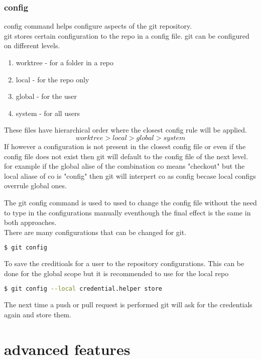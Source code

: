 \documentclass{book}
\begin{document}
\section{config}
config command helps configure aspects of the git repository.\\
git stores certain configuration to the repo in a config file.
git can be configured on different levels.
\begin{enumerate}
\item worktree - for a folder in a repo
\item local    - for the repo only
\item global   - for the user
\item system   - for all users
\end{enumerate}
These files have hierarchical order where the closest config rule will be applied. \\
$$worktree > local >  global > system $$
If however a configuration is not present in the closest config file or even if the config file 
does not exist then git will default to the config file of the next level.
for example 
if the global alise of the combination co means "checkout" but the local aliase of co is "config" then git will 
interpert co as config becase local configs overrule global ones.\par
The git config command is used to used to change the config file without the need to type in the configurations manually 
eventhough the final effect is the same in both approaches.\\
There are many configurations that can be changed for git.
\begin{lstlisting}[language=bash]
$ git config 
\end{lstlisting}
To save the creditioals for a user to the repository configurations. 
This can be done for the global scope but it is recommended to use for the local repo
\begin{lstlisting}[language=bash]
$ git config --local credential.helper store
\end{lstlisting}
The next time a push or pull request is performed git will ask for the credentials again and store them.




\part{advanced features}
\end{document}
